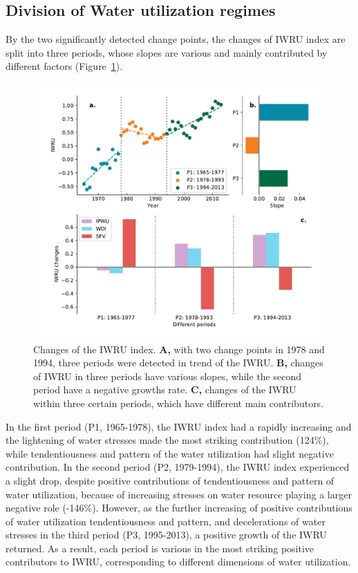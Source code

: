 \documentclass[9pt, twocolumn, twoside, lineno]{pnas-new}
\begin{document}
\subsection*{Division of Water utilization regimes}
By the two significantly detected change points,
the changes of IWRU index are split into three periods, 
whose slopes are various and mainly contributed by different factors (Figure~\ref{fig:IWRU}).
\begin{figure}%
	\centering
	\includegraphics[width=\linewidth]{../../figures/main_text/index.pdf}
	\caption{Changes of the IWRU index. 
	\textbf{A,} with two change points in 1978 and 1994, three periods were detected in trend of the IWRU.
	\textbf{B,} changes of IWRU in three periods have various slopes, while the second period have a negative growths rate.
	\textbf{C,} changes of the IWRU within three certain periods, which have different main contributors.
	}
	\label{fig:IWRU}
\end{figure}
In the first period (P1, 1965-1978), the IWRU index had a rapidly increasing 
and the lightening of water stresses made the most striking contribution (124\%), 
while tendentiousness and pattern of the water utilization had slight negative contribution.
In the second period (P2, 1979-1994), the IWRU index experienced a slight drop, 
despite positive contributions of tendentiousness and pattern of water utilization,
because of increasing stresses on water resource playing a larger negative role (-146\%). 
However, as the further increasing of positive contributions of water utilization tendentiousness and pattern, 
and decelerations of water stresses in the third period (P3, 1995-2013), a positive growth of the IWRU returned.
As a result, each period is various in the most striking positive contributors to IWRU, 
corresponding to different dimensions of water utilization.
\end{document}
